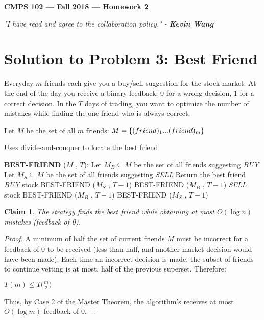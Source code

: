 \documentclass[11pt]{article}
\theoremstyle{definition}
\theoremstyle{plain}
\newtheorem{claim}{Claim}
\theoremstyle{indented-remark}
\theoremstyle{indented-proof}
\begin{document}
\begin{center}
{\bf\Large CMPS 102 --- Fall 2018 ---  Homework 2}
\end{center}

\begin{center}
\textit{"I have read and agree to the collaboration policy." - \textbf{Kevin Wang}}
\end{center}

\section*{Solution to Problem 3: Best Friend}

Everyday $m$ friends each give you a buy/sell suggestion for the stock market. At the end of the day you receive a binary feedback: 0 for a wrong decision, 1 for a correct decision. In the $T$ days of trading, you want to optimize the number of mistakes while finding the one friend who is always correct. \newline

\noindent Let $M$ be the set of all $m$ friends: 
$M = \{ \text(friend)_{1}...\text(friend)_{m} \}$

\begin{algorithm}
\caption{Uses divide-and-conquer to locate the best friend}
\begin{algorithmic} 
\STATE \textbf{BEST-FRIEND} ($M$ , $T$):
\STATE Let $M_{B} \subseteq M$ be the set of all friends suggesting \textit{BUY}
\STATE Let $M_{S} \subseteq M$ be the set of all friends suggesting \textit{SELL}
\STATE Return the best friend
\STATE \textit{BUY} stock
\STATE BEST-FRIEND ($M_{S}$ , $T-1$)
\ELSE [feedback is 1]
\STATE BEST-FRIEND ($M_{B}$ , $T-1$)
\ENDIF
\ELSE [$|M_{S}| > |M_{B}|$]
\STATE \textit{SELL} stock
\STATE BEST-FRIEND ($M_{B}$ , $T-1$)
\ELSE [feedback is 1]
\STATE BEST-FRIEND ($M_{S}$ , $T-1$)
\ENDIF
\ENDIF
\end{algorithmic}
\end{algorithm}

\begin{claim}
The strategy finds the best friend while obtaining at most $O(\log n)$ mistakes (feedback of 0).
\end{claim}

\begin{proof}
A minimum of half the set of current friends $M$ must be incorrect for a feedback of 0 to be received (less than half, and another market decision would have been made). Each time an incorrect decision is made, the subset of friends to continue vetting is at most, half of the previous superset. Therefore:
\begin{center}
$T(m) \leq T \big( \frac{m}{2} \big)$
\end{center}
Thus, by Case 2 of the Master Theorem, the algorithm's receives at most $O(\log m)$ feedback of 0.
\end{proof}
\end{document}
